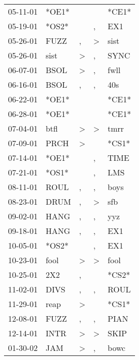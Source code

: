\begin{supertabular}{lllll}
 05-11-01 &  *OE1* &                  &                  &  *CE1* \\
 05-19-01 &  *OS2* &                  &                , &    EX1 \\
 05-26-01 &   FUZZ &                , &     \textgreater &   sist \\
 05-26-01 &   sist &     \textgreater &                , &   SYNC \\
 06-07-01 &   BSOL &     \textgreater &                , &   fwll \\
 06-16-01 &   BSOL &                , &                , &    40s \\
 06-22-01 &  *OE1* &                  &                  &  *CE1* \\
 06-28-01 &  *OE1* &                  &                  &  *CE1* \\
 07-04-01 &   btfl &     \textgreater &     \textgreater &   tmrr \\
 07-09-01 &   PRCH &     \textgreater &                  &  *CS1* \\
 07-14-01 &  *OE1* &                  &                , &   TIME \\
 07-21-01 &  *OS1* &                  &                , &    LMS \\
 08-11-01 &   ROUL &                , &                , &   boys \\
 08-23-01 &   DRUM &                , &     \textgreater &    sfb \\
 09-02-01 &   HANG &                , &                , &    yyz \\
 09-18-01 &   HANG &                , &                , &    EX1 \\
 10-05-01 &  *OS2* &                  &                , &    EX1 \\
 10-23-01 &   fool &     \textgreater &     \textgreater &   fool \\
 10-25-01 &    2X2 &                , &                  &  *CS2* \\
 11-02-01 &   DIVS &                , &                , &   ROUL \\
 11-29-01 &   reap &     \textgreater &                  &  *CS1* \\
 12-08-01 &   FUZZ &                , &                , &   PIAN \\
 12-14-01 &   INTR &     \textgreater &     \textgreater &   SKIP \\
 01-30-02 &    JAM &     \textgreater &                , &   bowc \\

\end{supertabular}
